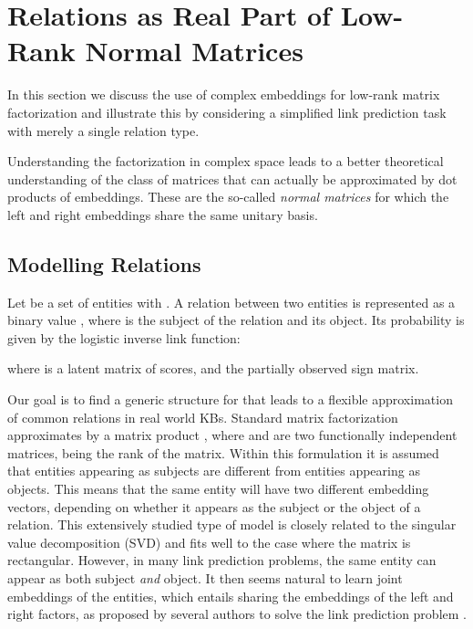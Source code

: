 \documentclass{article}
\begin{document}
\section{Relations as Real Part of Low-Rank Normal Matrices}
In this section we discuss the use of complex embeddings for low-rank matrix factorization and illustrate this by \mbox{considering} a simplified link prediction task with merely a single relation type. 


Understanding the factorization in complex space leads to a better theoretical understanding of the class of matrices that can actually be approximated by dot products of embeddings. These are the so-called \emph{normal matrices} for which the left and  right embeddings share the same unitary basis. 









\subsection{Modelling Relations}

Let  be a set of entities with . A relation between two entities is represented as a binary value , where  is the subject of the relation and  its object. Its probability is given by the logistic inverse link function:

where  is a latent matrix of scores, and  the partially observed sign matrix.

Our goal is to find a 
generic structure for  that leads to a flexible approximation of common relations in real world KBs. Standard matrix factorization approximates  by 
a matrix product , where  and  are two functionally independent  matrices,  being the rank of the matrix. Within this formulation it is assumed that entities appearing as subjects are different from entities appearing as objects. This means that the same entity will have two different embedding vectors, depending on whether it appears as the subject or the object of a relation. 
This extensively studied type of model is closely related to the singular value decomposition (SVD) and fits well to the case where the matrix  is rectangular. However, in many link prediction problems, the same entity can appear as both subject
\emph{and} object. It then seems natural to learn joint embeddings of the entities, 
which entails sharing the embeddings of the left and right factors, as proposed by several authors to solve the link prediction problem \cite{Nickel2011,bordes2013translating,Yang2015}. 
\end{document}
